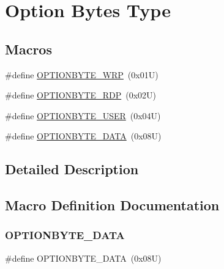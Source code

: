 \hypertarget{group___f_l_a_s_h_ex___o_b___type}{}\section{Option Bytes Type}
\label{group___f_l_a_s_h_ex___o_b___type}
\subsection*{Macros}
\begin{DoxyCompactItemize}
\item 
\#define \hyperlink{group___f_l_a_s_h_ex___o_b___type_ga48712a166ea192ddcda0f2653679f9ec}{O\+P\+T\+I\+O\+N\+B\+Y\+T\+E\+\_\+\+W\+RP}~(0x01\+U)
\item 
\#define \hyperlink{group___f_l_a_s_h_ex___o_b___type_ga8f0bdb21ef13bae39d5d8b6619e2df06}{O\+P\+T\+I\+O\+N\+B\+Y\+T\+E\+\_\+\+R\+DP}~(0x02\+U)
\item 
\#define \hyperlink{group___f_l_a_s_h_ex___o_b___type_gac7d843e666e15c79688a1914e8ffe7a5}{O\+P\+T\+I\+O\+N\+B\+Y\+T\+E\+\_\+\+U\+S\+ER}~(0x04\+U)
\item 
\#define \hyperlink{group___f_l_a_s_h_ex___o_b___type_gad0c29c84acfb46de1708a670529175a5}{O\+P\+T\+I\+O\+N\+B\+Y\+T\+E\+\_\+\+D\+A\+TA}~(0x08\+U)
\end{DoxyCompactItemize}


\subsection{Detailed Description}


\subsection{Macro Definition Documentation}
\mbox{\label{group___f_l_a_s_h_ex___o_b___type_gad0c29c84acfb46de1708a670529175a5}} 
\subsubsection{\texorpdfstring{O\+P\+T\+I\+O\+N\+B\+Y\+T\+E\+\_\+\+D\+A\+TA}{OPTIONBYTE\_DATA}}
{\footnotesize\ttfamily \#define O\+P\+T\+I\+O\+N\+B\+Y\+T\+E\+\_\+\+D\+A\+TA~(0x08\+U)}

